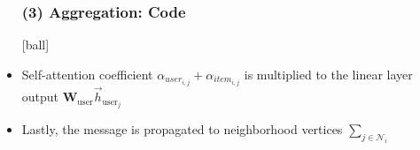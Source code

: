 \documentclass{beamer}
\begin{document}
\begin{frame}[fragile]
\begin{itemize}
\frametitle{(3) Aggregation: Code}
[ball]

\item Self-attention coefficient $\alpha_{user_{i,j}}+\alpha_{item_{i,j}}$ is multiplied to the linear layer output $\mathbf{W}_{\text{user}}\overrightarrow{h}_{\text{user}_j}$



\item Lastly, the message is propagated to neighborhood vertices $\sum_{j \in \mathcal{N}_{i}}$  


\end{itemize}
\end{frame}

\end{document}
